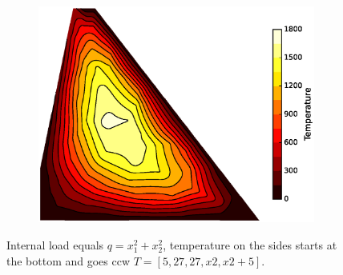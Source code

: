 \documentclass[10pt, a4paper]{article}
\begin{document}
\begin{figure}[H]
\begin{subfigure}[H]{0.33\textwidth}
		\includegraphics[width=\textwidth]{fig/exdam2_3.eps}
		\caption{}
		\label{fig:3}
	\end{subfigure}
	\caption{Internal load equals $q=x_1^2 + x_2^2$, temperature on the sides starts at the bottom and goes ccw $T=[5, 27, 27, x2, x2+5]$.}
	\label{fig:3_1}
\end{figure}
\end{document}
